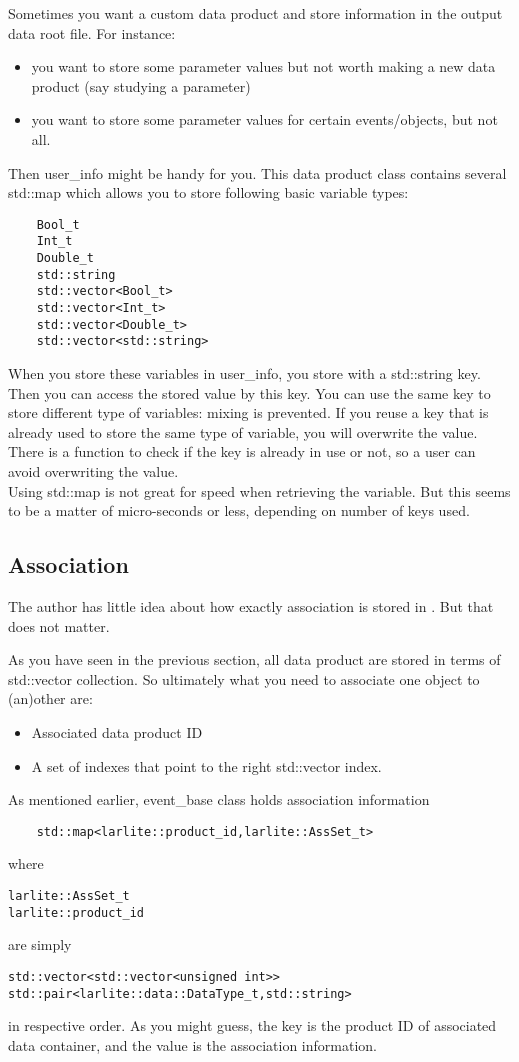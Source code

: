 Sometimes you want a custom data product and store information in the output data root file.
For instance:
\begin{itemize}
\item you want to store some parameter values but not worth making a new data product (say studying a parameter)
\item you want to store some parameter values for certain events/objects, but not all.
\end{itemize}

Then {\ttfamily user\_info} might be handy for you. This data product class contains several {\ttfamily std::map} which allows you to store following basic variable types:
\begin{lstlisting}
    Bool_t
    Int_t
    Double_t
    std::string
    std::vector<Bool_t>
    std::vector<Int_t>
    std::vector<Double_t>
    std::vector<std::string>
\end{lstlisting}
When you store these variables in {\ttfamily user\_info}, you store with a {\ttfamily std::string} key. 
Then you can access the stored value by this key. 
You can use the same key to store different type of variables: mixing is prevented.
If you reuse a key that is already used to store the same type of variable, you will overwrite the value.
There is a function to check if the key is already in use or not, so a user can avoid overwriting the value.\\

Using {\ttfamily std::map} is not great for speed when retrieving the variable. 
But this seems to be a matter of micro-seconds or less, depending on number of keys used.

\subsection{Association}
\label{chap:dataformat:association}
The author has little idea about how exactly association is stored in \ART. But that does not matter.

As you have seen in the previous section, all data product are stored in terms of {\ttfamily std::vector} collection.
So ultimately what you need to associate one object to (an)other are:
\begin{itemize}
\item Associated data product ID
\item A set of indexes that point to the right {\ttfamily std::vector} index.
\end{itemize}
As mentioned earlier, {\ttfamily event\_base} class holds association information
\begin{lstlisting}
    std::map<larlite::product_id,larlite::AssSet_t>
\end{lstlisting}
where 
\begin{lstlisting}
larlite::AssSet_t
larlite::product_id
\end{lstlisting}
are simply
\begin{lstlisting}
std::vector<std::vector<unsigned int>>
std::pair<larlite::data::DataType_t,std::string>
\end{lstlisting}
in respective order. As you might guess, the key is the product ID of associated data container, and the value is the association information. 

